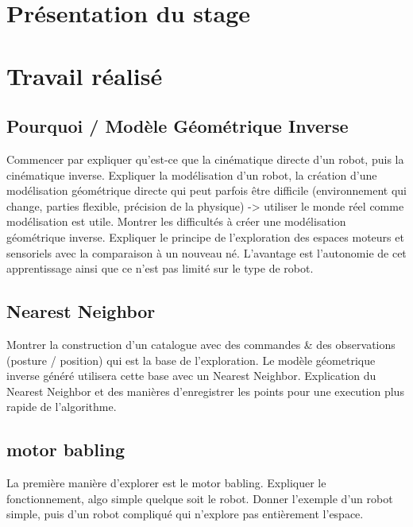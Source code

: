 \documentclass[11pt,french]{report}
\begin{document}
\chapter{Présentation du stage}

\chapter{Travail réalisé}

\section{Pourquoi / Modèle Géométrique Inverse}
Commencer par expliquer qu'est-ce que la cinématique directe d'un robot, puis la cinématique inverse. Expliquer la modélisation d'un robot, la création d'une modélisation géométrique directe qui peut parfois être difficile (environnement qui change, parties flexible, précision de la physique) -> utiliser le monde réel comme modélisation est utile.
Montrer les difficultés à créer une modélisation géométrique inverse. Expliquer le principe de l'exploration des espaces moteurs et sensoriels avec la comparaison à un nouveau né. L'avantage est l'autonomie de cet apprentissage ainsi que ce n'est pas limité sur le type de robot.

\section{Nearest Neighbor}
Montrer la construction d'un catalogue avec des commandes \& des observations (posture / position) qui est la base de l'exploration. Le modèle géometrique inverse généré utilisera cette base avec un Nearest Neighbor. Explication du Nearest Neighbor et des manières d'enregistrer les points pour une execution plus rapide de l'algorithme.

\section{motor babling}
La première manière d'explorer est le motor babling. Expliquer le fonctionnement, algo simple quelque soit le robot. Donner l'exemple d'un robot simple, puis d'un robot compliqué qui n'explore pas entièrement l'espace.
\end{document}
